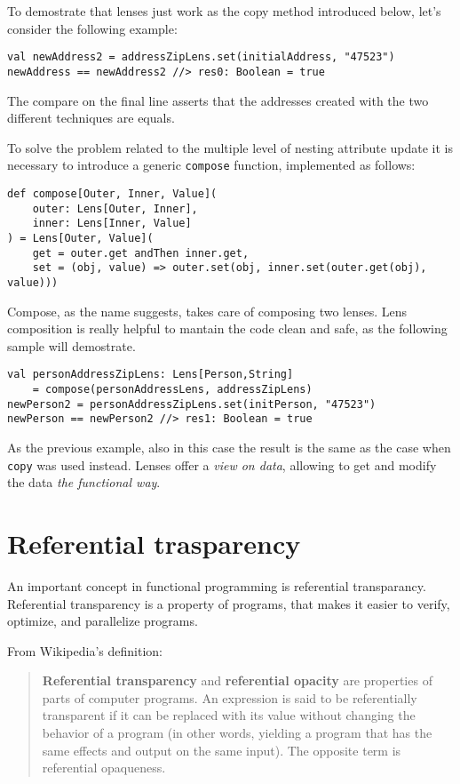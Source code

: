 To demostrate that lenses just work as the copy method introduced below,
let's consider the following example:

\begin{verbatim}
val newAddress2 = addressZipLens.set(initialAddress, "47523")
newAddress == newAddress2 //> res0: Boolean = true
\end{verbatim}

The compare on the final line asserts that the addresses created with
the two different techniques are equals.

To solve the problem related to the multiple level of nesting attribute
update it is necessary to introduce a generic \texttt{compose} function,
implemented as follows:

\begin{verbatim}
def compose[Outer, Inner, Value](
    outer: Lens[Outer, Inner],
    inner: Lens[Inner, Value]
) = Lens[Outer, Value](
    get = outer.get andThen inner.get,
    set = (obj, value) => outer.set(obj, inner.set(outer.get(obj), value)))
\end{verbatim}

Compose, as the name suggests, takes care of composing two lenses. Lens
composition is really helpful to mantain the code clean and safe, as the
following sample will demostrate.

\begin{verbatim}
val personAddressZipLens: Lens[Person,String] 
	= compose(personAddressLens, addressZipLens)
newPerson2 = personAddressZipLens.set(initPerson, "47523")
newPerson == newPerson2 //> res1: Boolean = true
\end{verbatim}

As the previous example, also in this case the result is the same as the
case when \texttt{copy} was used instead. Lenses offer a \emph{view on
data}, allowing to get and modify the data \emph{the functional way}.

\section{Referential trasparency}\label{referential-trasparency}

An important concept in functional programming is referential
transparancy. Referential transparency is a property of programs, that
makes it easier to verify, optimize, and parallelize programs.

From Wikipedia's definition:

\begin{quote}
\textbf{Referential transparency} and \textbf{referential opacity} are
properties of parts of computer programs. An expression is said to be
referentially transparent if it can be replaced with its value without
changing the behavior of a program (in other words, yielding a program
that has the same effects and output on the same input). The opposite
term is referential opaqueness.
\end{quote}

